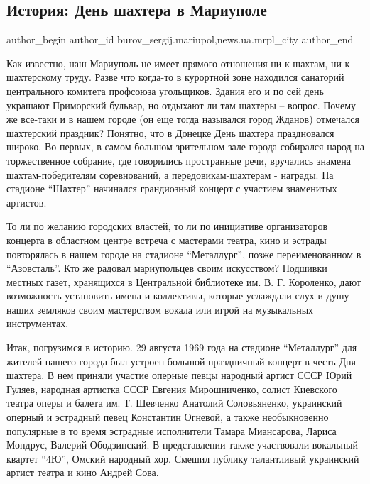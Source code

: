  
 
 
 
 
 
\subsection{История: День шахтера в Мариуполе}
\label{sec:27_08_2017.stz.news.ua.mrpl_city.1.istoria_den_shahtera_v_mariupole}
 
\ifcmt
 author_begin
   author_id burov_sergij.mariupol,news.ua.mrpl_city
 author_end
\fi

Как известно, наш Мариуполь не имеет прямого отношения ни к шахтам, ни к
шахтерскому труду. Разве что когда-то в курортной зоне находился санаторий
центрального комитета профсоюза угольщиков. Здания его и по сей день украшают
Приморский бульвар, но отдыхают ли там шахтеры – вопрос. Почему же все-таки и в
нашем городе (он еще тогда назывался город Жданов) отмечался шахтерский
праздник? Понятно, что в Донецке День шахтера праздновался широко. Во-первых,
в самом большом зрительном зале города собирался народ на торжественное
собрание, где говорились пространные речи, вручались знамена шахтам-победителям
соревнований, а передовикам-шахтерам - награды. На стадионе \enquote{Шахтер} начинался
грандиозный концерт с участием знаменитых артистов.

То ли по желанию городских властей, то ли по инициативе организаторов концерта
в областном центре встреча с мастерами театра, кино и эстрады повторялась в
нашем городе на стадионе \enquote{Металлург}, позже переименованном в \enquote{Азовсталь}. Кто
же  радовал мариупольцев своим искусством? Подшивки местных газет, хранящихся в
Центральной библиотеке им. В. Г. Короленко, дают возможность установить имена и
коллективы, которые услаждали слух и душу наших земляков своим мастерством
вокала или игрой на музыкальных инструментах.

Итак, погрузимся в историю. 29 августа 1969 года на стадионе \enquote{Металлург} для
жителей нашего города был устроен большой праздничный концерт в честь Дня
шахтера. В нем приняли участие оперные певцы народный артист СССР Юрий  Гуляев,
народная артистка СССР Евгения Мирошниченко, солист Киевского театра оперы и
балета им. Т. Шевченко  Анатолий Соловьяненко, украинский оперный и эстрадный
певец Константин Огневой, а также необыкновенно популярные в то время эстрадные
исполнители Тамара Миансарова, Лариса Мондрус, Валерий Ободзинский. В
представлении также участвовали  вокальный квартет \enquote{4Ю}, Омский народный хор.
Смешил публику талантливый украинский артист театра и кино Андрей Сова.

